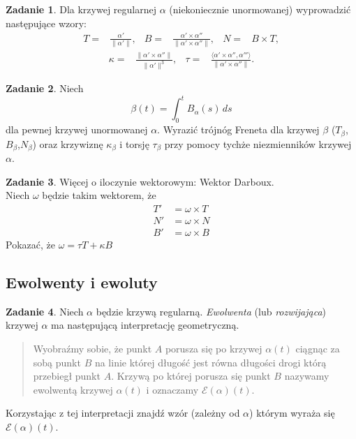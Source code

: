 \documentclass[a4paper,11pt]{article}
\theoremstyle{definition}\newtheorem{exercise}{Zadanie}
\theoremstyle{definition}\newtheorem{remark}{Uwaga}
\begin{document}
\begin{exercise}
Dla krzywej regularnej $\alpha$ (niekoniecznie unormowanej) wyprowadzić 
następujące wzory:
\begin{align*}
 T=& \frac{\alpha'}{\|\alpha'\|},& 
B=& \frac{\alpha'\times \alpha''}{\|\alpha'\times 
\alpha''\|}, & N=& B\times T,
\end{align*}
\begin{align*}
\kappa=&\frac{\|\alpha'\times \alpha''\|}{\|\alpha'\|^{3}}, & 
\tau=&\frac{\langle \alpha'\times 
\alpha'',\alpha'''\rangle}{\|\alpha'\times \alpha''\|}.
\end{align*}
\end{exercise}

\begin{exercise}
Niech \[\beta(t)=\int_0^t B_\alpha (s)\,ds\] dla pewnej krzywej unormowanej 
$\alpha$. Wyrazić trójnóg Freneta dla krzywej $\beta$ 
($T_\beta$,$B_\beta$,$N_\beta$) oraz krzywiznę $\kappa_\beta$ i torsję 
$\tau_\beta$ przy pomocy tychże niezmienników krzywej $\alpha$.
\end{exercise}


\begin{exercise}
Więcej o iloczynie wektorowym: Wektor Darboux.\\
Niech $\omega$ będzie takim wektorem, że 
\begin{align*}
T'&=\omega\times T\\
N'&=\omega\times N\\
B'&=\omega\times B
\end{align*}
Pokazać, że $\omega=\tau T+\kappa B$

\end{exercise}


\subsection{Ewolwenty i ewoluty}
\begin{exercise}
Niech $\alpha$ będzie krzywą regularną. \textit{Ewolwenta} (lub 
\textit{rozwijająca}) krzywej $\alpha$ ma następującą interpretację 
geometryczną.

\begin{quote}
Wyobraźmy sobie, że punkt $A$ porusza się po krzywej $\alpha(t)$ ciągnąc za 
sobą punkt $B$ na linie kt\'orej długość jest r\'owna długości drogi kt\'orą 
przebiegł punkt $A$. Krzywą po kt\'orej porusza się punkt $B$ nazywamy 
ewolwentą krzywej $\alpha(t)$ i oznaczamy $\mathcal{E}(\alpha)(t)$.
\end{quote}

Korzystając z tej interpretacji znajdź wz\'or (zależny od $\alpha$) kt\'orym 
wyraża się $\mathcal{E}(\alpha)(t)$.
\end{exercise}
\end{document}
